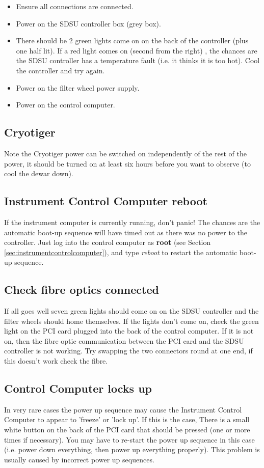 \documentclass[10pt,a4paper]{article}
\begin{document}
\begin{itemize}
\item Ensure all connections are connected.
\item Power on the SDSU controller box (grey box).
\item There should be 2 green lights come on on the back of the controller (plus one half lit).
      If a red light comes on (second from the right) , the chances are the SDSU controller has a temperature fault 
	(i.e. it thinks it is too hot). Cool the controller and try again.
\item Power on the filter wheel power supply.
\item Power on the control computer.
\end{itemize}

\subsection{Cryotiger}
Note the Cryotiger power can be switched on independently of the rest of the power, it should be turned on
at least six hours before you want to observe (to cool the dewar down).

\subsection{Instrument Control Computer reboot}
If the instrument computer is currently running, don't panic! The chances are the automatic boot-up sequence will have
timed out as there was no power to the controller. Just log into the control computer as {\bf root} 
(see Section \ref{sec:instrumentcontrolcomputer}), 
and type {\em reboot} to restart the automatic boot-up sequence.

\subsection{Check fibre optics connected}
If all goes well seven green lights should come on on the SDSU controller and the filter wheels should home themselves.
If the lights don't come on, check the green light on the PCI card plugged into the back of the control computer.
If it is not on, then the fibre optic communication between the PCI card and the SDSU controller is not working.
Try swapping the two connectors round at one end, if this doesn't work check the fibre.

\subsection{Control Computer locks up}
In very rare cases the power up sequence may cause the Instrument Control Computer to appear to 'freeze' or 'lock up'.
If this is the case, There is a small white button on the back of the PCI card that should be pressed (one or
more times if necessary). You may have to re-start the power up sequence in this case (i.e. power down everything,
then power up everything properly). This problem is usually caused by incorrect power up sequences.
\end{document}
